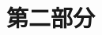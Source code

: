 \documentclass[9pt]{beamer}
\begin{document}
%	
%	
%	
%	
%	
%	
%	
%	
%	
	
	\section{第二部分}	
	
\end{document}
